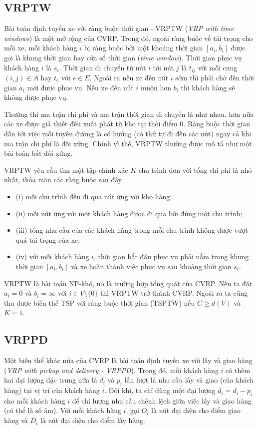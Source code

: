 \subsection{VRPTW}
Bài toán định tuyến xe với ràng buộc thời gian - VRPTW (\textit{VRP with time windows}) là một mở rộng của CVRP. Trong đó, ngoài ràng buộc về tải trọng cho mỗi xe, mỗi khách hàng $i$ bị ràng buộc bởi một khoảng thời gian $[a_i, b_i]$ được gọi là khung thời gian hay cửa sổ thời gian (\textit{time window}). Thời gian phục vụ khách hàng $i$ là $s_i$. Thời gian di chuyển từ nút $i$ tới nút $j$ là $t_{ij}$ với mỗi cung $(i,j) \in A$ hay $t_e$ với $e \in E$. Ngoài ra nếu xe đến nút $i$ sớm thì phải chờ đến thời gian $a_i$ mới được phục vụ. Nếu xe đến nút $i$ muộn hơn $b_i$ thì khách hàng sẽ không được phục vụ.

Thường thì ma trận chi phí và ma trận thời gian di chuyển là như nhau, hơn nữa các xe được giả thiết đều xuất phát từ kho tại thời điểm $0$. Ràng buộc thời gian dẫn tới việc mỗi tuyến đường là có hướng (có thứ tự đi đến các nút) ngay cả khi ma trận chi phí là đối xứng. Chính vì thế, VRPTW thường được mô tả như một bài toán bất đối xứng.

VRPTW yêu cầu tìm một tập chính xác $K$ chu trình đơn với tổng chi phí là nhỏ nhất, thỏa mãn các ràng buộc sau đây
\begin{itemize}
	\item[] (i) mỗi chu trình đều đi qua nút ứng với kho hàng;
	\item[] (ii) mỗi nút ứng với một khách hàng được đi qua bởi đúng một chu trình;
	\item[] (iii) tổng nhu cầu của các khách hàng trong mỗi chu trình không được vượt quá tải trọng của xe;
	\item[] (iv) với mỗi khách hàng $i$, thời gian bắt đầu phục vụ phải nằm trong khung thời gian $[a_i, b_i]$ và xe hoàn thành việc phục vụ sau khoảng thời gian $s_i$.
\end{itemize}

VRPTW là bài toán NP-khó, nó là trường hợp tổng quát của CVRP. Nếu ta đặt $a_i=0$ và $b_i=\infty$ với $i \in V \setminus \{0\}$ thì VRPTW trở thành CVRP. Ngoài ra ta cũng thu được biến thể TSP với ràng buộc thời gian (TSPTW) nếu $C \geq d(V)$ và $K=1$.

\subsection{VRPPD}
Một biến thể khác nữa của CVRP là bài toán định tuyến xe với lấy và giao hàng (\textit{VRP with pickup and delivery - VRPPD}). Trong đó, mỗi khách hàng $i$ có thêm hai đại lượng đặc trưng nữa là $d_i$ và $p_i$ lần lượt là nhu cầu lấy và giao (của khách hàng) tại vị trí của khách hàng $i$. Đôi khi, ta chỉ dùng một đại lượng $d_i = d_i - p_i$ cho mỗi khách hàng $i$ để chỉ lượng nhu cầu chênh lệch giữa việc lấy và giao hàng (có thể là số âm). Với mỗi khách hàng $i$, gọi $O_i$ là nút đại diện cho điểm giao hàng và $D_i$ là nút đại diện cho điểm lấy hàng.

